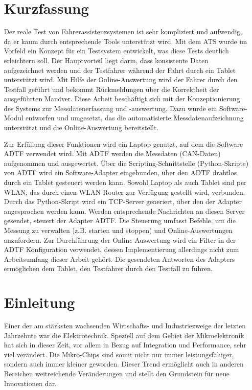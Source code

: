 \documentclass[12pt,a4paper]{report}
\begin{document}
\chapter*{Kurzfassung} %


Der reale Test von Fahrerassistenzsystemen ist sehr kompliziert und aufwendig, da er kaum durch entsprechende Tools unterstützt wird. Mit dem ATS wurde im Vorfeld ein Konzept für ein Testsystem entwickelt, was diese Tests deutlich erleichtern soll. Der Hauptvorteil liegt darin, dass konsistente Daten aufgezeichnet werden und der Testfahrer während der Fahrt durch ein Tablet unterstützt wird. Mit Hilfe der Online-Auswertung wird der Fahrer durch den Testfall geführt und bekommt Rückmeldungen über die Korrektheit der ausgeführten Manöver. Diese Arbeit beschäftigt sich mit der Konzeptionierung des Systems zur Messdatenerfassung und -auswertung. Dazu wurde ein Software-Modul entworfen und umgesetzt, das die automatisierte Messdatenaufzeichnung unterstützt und die Online-Auswertung bereitstellt.

Zur Erfüllung dieser Funktionen wird ein Laptop genutzt, auf dem die Software ADTF verwendet wird. Mit ADTF werden die Messdaten (CAN-Daten) aufgenommen und ausgewertet. Über die Scrip\-ting\--Schnitt\-stelle (Python-Skripte) von ADTF wird ein Software-Adapter eingebunden, über den ADTF drahtlos durch ein Tablet gesteuert werden kann. Sowohl Laptop als auch Tablet sind per WLAN, das durch einen WLAN-Router zur Verfügung gestellt wird, verbunden. Durch das Python-Skript wird ein TCP-Server generiert, über den der Adapter angesprochen werden kann. Werden entsprechende Nachrichten an diesen Server gesendet, steuert der Adapter ADTF. Die Steuerung umfasst Befehle, um die Messung zu verwalten (z.B. starten und stoppen) und Online-Auswertungen anzufordern. Zur Durchführung der Online-Auswertung wird ein Filter in der ADTF Konfiguration verwendet, dessen Implementierung allerdings nicht zum Arbeitsumfang dieser Arbeit gehört. Die gesendeten Antworten des Adapters ermöglichen dem Tablet, den Testfahrer durch den Testfall zu führen.
\tableofcontents
\newpage
\chapter{Einleitung}\label{chap:Einleitung}
Einer der am stärksten wachsenden Wirtschafts- und Industriezweige der letzten Jahrzehnte war die Elektrotechnik. Speziell auf dem Gebiet der Mikroelektronik hat sich in dieser Zeit, vor allem in Bezug auf Integration und Performance, sehr viel verändert. Die Mikro-Chips sind somit nicht nur immer leistungsfähiger, sondern auch immer kleiner geworden. Dieser Trend ermöglicht auch in anderen Bereichen weitreichende Veränderungen und stellt den Grundstein für neue Innovationen dar. 
\end{document}
